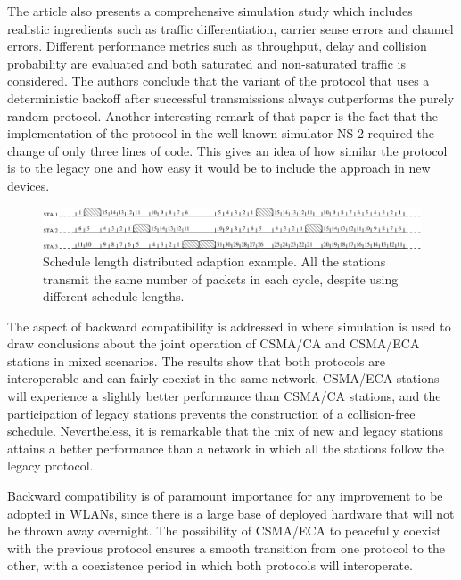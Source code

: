 \documentclass[journal]{IEEEtran}
\begin{document}
The article also presents a comprehensive simulation study which includes realistic ingredients such as traffic differentiation, carrier sense errors and channel errors.
Different performance metrics such as throughput, delay and collision probability are evaluated and both saturated and non-saturated traffic is considered.
The authors conclude that the variant of the protocol that uses a deterministic backoff after successful transmissions always outperforms the purely random protocol.
Another interesting remark of that paper is the fact that the implementation of the protocol in the well-known simulator NS-2 required the change of only three lines of code.
This gives an idea of how similar the protocol is to the legacy one and how easy it would be to include the approach in new devices.

\begin{figure}[!t]
\centering
\includegraphics[width=6.0in]{figures/csma_eca_different_backoff}
\caption{Schedule length distributed adaption example. All the stations transmit the same number of packets in each cycle, despite using different schedule lengths.}
\label{fig:csma_eca_different_backoff}
\end{figure}

The aspect of backward compatibility is addressed in \cite{barcelo2010fcc} where simulation is used to draw conclusions about the joint operation of CSMA/CA and CSMA/ECA stations in mixed scenarios. 
The results show that both protocols are interoperable and can fairly coexist in the same network.
CSMA/ECA stations will experience a slightly better performance than CSMA/CA stations, and the participation of legacy stations prevents the construction of a collision-free schedule.
Nevertheless, it is remarkable that the mix of new and legacy stations attains a better performance than a network in which all the stations follow the legacy protocol.

Backward compatibility is of paramount importance for any improvement to be adopted in WLANs, since there is a large base of deployed hardware that will not be thrown away overnight.
The possibility of CSMA/ECA to peacefully coexist with the previous protocol ensures a smooth transition from one protocol to the other, with a coexistence period in which both protocols will interoperate.
\end{document}
